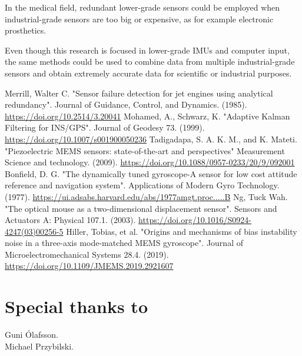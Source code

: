 \documentclass[10pt, twocolumn, a4paper]{article}
\begin{document}
    In the medical field, redundant lower-grade sensors could be employed when industrial-grade sensors are too big or expensive, as for example electronic prosthetics.

    Even though this research is focused in lower-grade IMUs and computer input, the same methods could be used to combine data from multiple industrial-grade sensors and obtain extremely accurate data for scientific or industrial purposes.

\begin{thebibliography}{99}
        Merrill, Walter C.
        "Sensor failure detection for jet engines using analytical redundancy". Journal of Guidance, Control, and Dynamics.
        (1985).
        \url{https://doi.org/10.2514/3.20041}
        Mohamed, A., Schwarz, K.
        "Adaptive Kalman Filtering for INS/GPS".
        Journal of Geodesy 73.
        (1999).
        \url{https://doi.org/10.1007/s001900050236}
        Tadigadapa, S. A. K. M., and K. Mateti.
        "Piezoelectric MEMS sensors: state-of-the-art and perspectives"
        Measurement Science and technology.
        (2009).
        \url{https://doi.org/10.1088/0957-0233/20/9/092001}
        Bonfield, D. G.
        "The dynamically tuned gyroscope-A sensor for low cost attitude reference and navigation system".
        Applications of Modern Gyro Technology.
        (1977).
        \url{https://ui.adsabs.harvard.edu/abs/1977amgt.proc.....B}
        Ng, Tuck Wah.
        "The optical mouse as a two-dimensional displacement sensor".
        Sensors and Actuators A: Physical 107.1.
        (2003).
        \url{https://doi.org/10.1016/S0924-4247(03)00256-5}
        Hiller, Tobias, et al.
        "Origins and mechanisms of bias instability noise in a three-axis mode-matched MEMS gyroscope".
        Journal of Microelectromechanical Systems 28.4.
        (2019).
        \url{https://doi.org/10.1109/JMEMS.2019.2921607}
\end{thebibliography}

\section*{Special thanks to}
\vspace{-2mm}
    Gu{\dh}ni Ólafsson.\\
    Michael Przybilski.
\end{document}
